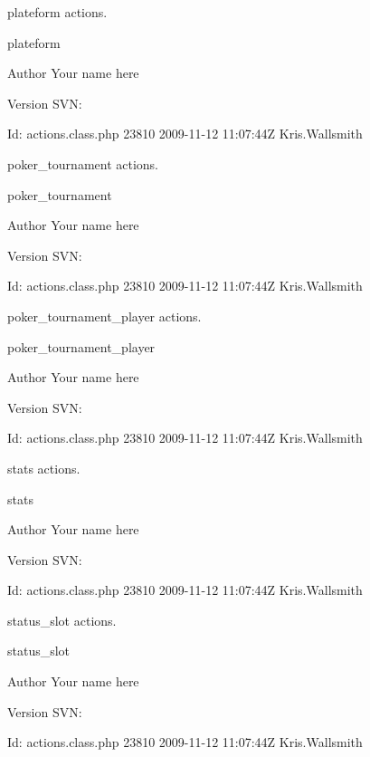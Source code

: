 plateform actions.

plateform \begin{DoxyAuthor}{Author}
Your name here 
\end{DoxyAuthor}
\begin{DoxyVersion}{Version}
S\-V\-N\-: 
\end{DoxyVersion}
\begin{DoxyParagraph}{Id\-:}
actions.\-class.\-php 23810 2009-\/11-\/12 11\-:07\-:44\-Z Kris.\-Wallsmith 
\end{DoxyParagraph}


poker\-\_\-tournament actions.

poker\-\_\-tournament \begin{DoxyAuthor}{Author}
Your name here 
\end{DoxyAuthor}
\begin{DoxyVersion}{Version}
S\-V\-N\-: 
\end{DoxyVersion}
\begin{DoxyParagraph}{Id\-:}
actions.\-class.\-php 23810 2009-\/11-\/12 11\-:07\-:44\-Z Kris.\-Wallsmith 
\end{DoxyParagraph}


poker\-\_\-tournament\-\_\-player actions.

poker\-\_\-tournament\-\_\-player \begin{DoxyAuthor}{Author}
Your name here 
\end{DoxyAuthor}
\begin{DoxyVersion}{Version}
S\-V\-N\-: 
\end{DoxyVersion}
\begin{DoxyParagraph}{Id\-:}
actions.\-class.\-php 23810 2009-\/11-\/12 11\-:07\-:44\-Z Kris.\-Wallsmith 
\end{DoxyParagraph}


stats actions.

stats \begin{DoxyAuthor}{Author}
Your name here 
\end{DoxyAuthor}
\begin{DoxyVersion}{Version}
S\-V\-N\-: 
\end{DoxyVersion}
\begin{DoxyParagraph}{Id\-:}
actions.\-class.\-php 23810 2009-\/11-\/12 11\-:07\-:44\-Z Kris.\-Wallsmith 
\end{DoxyParagraph}


status\-\_\-slot actions.

status\-\_\-slot \begin{DoxyAuthor}{Author}
Your name here 
\end{DoxyAuthor}
\begin{DoxyVersion}{Version}
S\-V\-N\-: 
\end{DoxyVersion}
\begin{DoxyParagraph}{Id\-:}
actions.\-class.\-php 23810 2009-\/11-\/12 11\-:07\-:44\-Z Kris.\-Wallsmith 
\end{DoxyParagraph}


